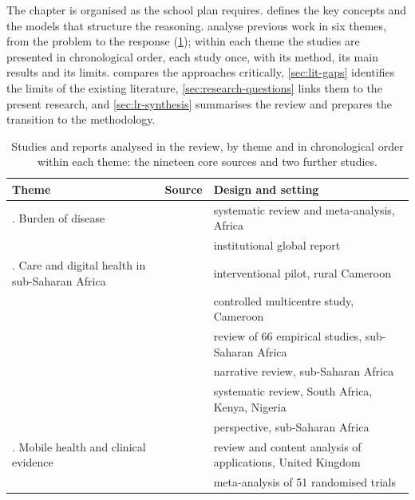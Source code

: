 The chapter is organised as the school plan requires.  defines the key concepts and the models that structure the reasoning.  analyse previous work in six themes, from the problem to the response (\cref{tab:lr-overview}); within each theme the studies are presented in chronological order, each study once, with its method, its main results and its limits.  compares the approaches critically, \cref{sec:lit-gaps} identifies the limits of the existing literature, \cref{sec:research-questions} links them to the present research, and \cref{sec:lr-synthesis} summarises the review and prepares the transition to the methodology.

\begin{table}[htbp]
\centering\footnotesize
\caption{Studies and reports analysed in the review, by theme and in chronological order within each theme: the nineteen core sources and two further studies.}\label{tab:lr-overview}
\begin{tabularx}{\textwidth}{@{}>{\raggedright\arraybackslash}p{3.4cm} >{\raggedright\arraybackslash}p{3.9cm} >{\raggedright\arraybackslash}X@{}}
\toprule
\textbf{Theme} & \textbf{Source} & \textbf{Design and setting} \\
\midrule
1. Burden of disease & \textcite{hinneh2023} & systematic review and meta-analysis, Africa \\
 & \textcite{who2023hypertension} & institutional global report \\
\addlinespace
2. Care and digital health in sub-Saharan Africa & \textcite{kingue2013} & interventional pilot, rural Cameroon \\
 & \textcite{bediang2021} & controlled multicentre study, Cameroon \\
 & \textcite{dodoo2022} & review of 66 empirical studies, sub-Saharan Africa \\
 & \textcite{gafane2024} & narrative review, sub-Saharan Africa \\
 & \textcite{agbeyangi2025} & systematic review, South Africa, Kenya, Nigeria \\
 & \textcite{segun2025} & perspective, sub-Saharan Africa \\
\addlinespace
3. Mobile health and clinical evidence & \textcite{alessa2019} & review and content analysis of applications, United Kingdom \\
 & \textcite{mao2020} & meta-analysis of 51 randomised trials \\

\end{tabularx}
\end{table}
